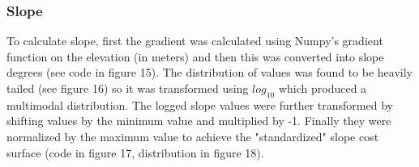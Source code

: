 \documentclass[article,12pt]{article}
\numberwithin{equation}{section}
\begin{document}
\subsubsection{Slope}

To calculate slope, first the gradient was calculated using Numpy's gradient function on the elevation (in meters) and then this was converted into slope degrees (see code in figure 15). The distribution of values was found to be heavily tailed (see figure 16) so it was transformed using $log_{10}$ which produced a multimodal distribution. The logged slope values were further transformed by shifting values by the minimum value and multiplied by -1. Finally they were normalized by the maximum value to achieve the "standardized" slope cost surface (code in figure 17, distribution in figure 18). 

\begin{adjustwidth}{-.8in}{-.8in}
	\begin{multicols}{2}
		\\
		\\
		\\
		\\
	\end{multicols}
\end{adjustwidth}
\end{document}
